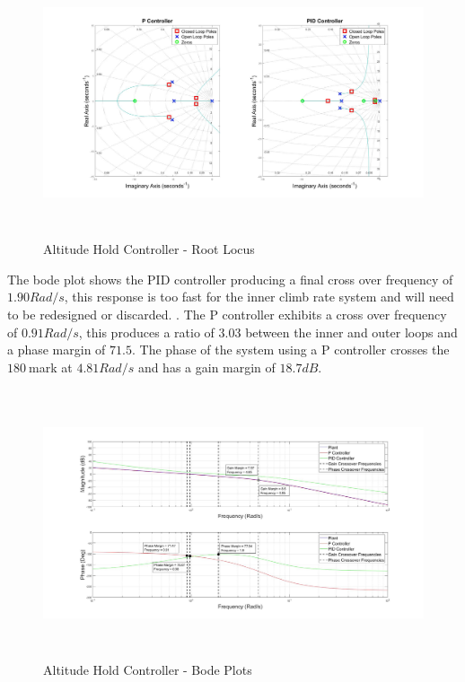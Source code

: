 	 \begin{figure}[H]
	 	\centering
	 	\includegraphics[height = 7.9cm]{../Design/Matlab/Controllers/altitude_root.jpg}
	 	\caption{Altitude Hold Controller -  Root Locus}
	 	\label{IM_AltHoldRoot}
	 \end{figure}
	 
	 The bode plot shows the PID controller producing a final cross over frequency of $1.90Rad/s$, this response is too fast for the inner climb rate system and will need to be redesigned or discarded. . The P controller exhibits a cross over frequency of $0.91Rad/s$, this produces a ratio of $3.03$ between the inner and outer loops and a phase margin of $71.5$\textdegree. The phase of the system using a P controller crosses the $180$\textdegree  $\ $mark at $4.81Rad/s$ and has a gain margin of $18.7dB$.
	 
	 \begin{figure}[H]
	 	\centering
	 	\includegraphics[height = 7.9cm]{../Design/Matlab/Controllers/altitude_bode.jpg}
	 	\caption{Altitude Hold Controller -  Bode Plots}
	 	\label{IM_AltHoldBode}
	 \end{figure}
	 
